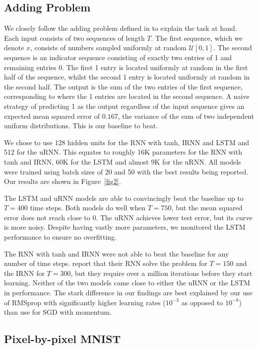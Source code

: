 \documentclass{article} %
\begin{document}
\subsection{Adding Problem}

We closely follow the adding problem defined in \cite{LSTM} to explain the task at hand.
Each input consists of two sequences of length $T$. 
The first sequence, which we denote $x$, consists of numbers sampled uniformly at random 
$\mathcal{U}[0,1]$. 
The second sequence is an indicator sequence consisting of exactly two entries of 1 and remaining entries 0.
The first 1 entry is located uniformly at random in the first half of the sequence, whilst the second 1
entry is located uniformly at random in the second half.
The output is the sum of the two entries of the first sequence, corresponding to where the 1 entries are
located in the second sequence. A naive strategy of predicting 1 as the output regardless of the input sequence gives an expected mean
squared error of $0.167$, the variance of the sum of two independent uniform distributions.
This is our baseline to beat.

We chose to use 128 hidden units for the RNN with tanh, IRNN and LSTM and 512 for the uRNN.
This equates to roughly 16K parameters for the RNN with tanh and IRNN, 60K for the LSTM and almost 9K for
the uRNN. All models were trained using batch sizes of 20 and 50 with the best results being reported.
Our results are shown in Figure~\ref{fig2}.

The LSTM and uRNN models are able to convincingly beat the baseline up to $T=400$ time steps.
Both models do well when $T=750$, but the mean squared error does not reach close to $0$.
The uRNN achieves lower test error, but its curve is more noisy. Despite having vastly more parameters,
we monitored the LSTM performance to ensure no overfitting.

The RNN with tanh and IRNN were not able to beat the baseline for any number of time steps. 
\cite{Quoc2015} report that their RNN solve the problem for $T=150$ and the IRNN for $T=300$,
but they require over a million iterations before they start learning. 
Neither of the two models came close to either the uRNN or the LSTM in performance.
The stark difference in our findings are best explained by our use of RMSprop with significantly higher 
learning rates ($10^{-3}$ as opposed to $10^{-8}$) than \cite{Quoc2015} use for SGD with momentum.

\vspace{-0.25mm}
\subsection{Pixel-by-pixel MNIST}
\end{document}
